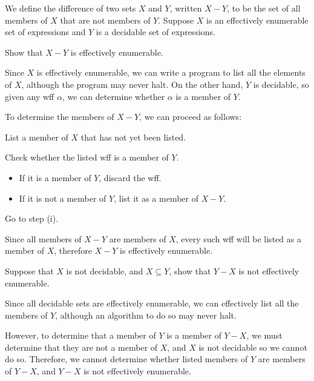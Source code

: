 \begin{problem}
  We define the difference of two sets $X$ and $Y$,
  written $X - Y$, to be the set of all members of $X$
  that are not members of $Y$.
  Suppose $X$ is an effectively enumerable set of expressions
  and $Y$ is a decidable set of expressions.
  \begin{enumalph}
    \item Show that $X - Y$ is effectively enumerable.
      \begin{Answer}
        Since $X$ is effectively enumerable, we can write a program to list
        all the elements of $X$, although the program may never halt.
        On the other hand, $Y$ is decidable, so given any wff $\alpha$,
        we can determine whether $\alpha$ is a member of $Y$.

        \step
        To determine the members of $X - Y$, we can proceed as follows:
        \begin{enumroman}
          \item List a member of $X$ that has not yet been listed.
          \item Check whether the listed wff is a member of $Y$.
            \begin{itemize}
              \item If it is a member of $Y$, discard the wff.
              \item If it is not a member of $Y$, list it as a member of $X - Y$.
            \end{itemize}
          \item Go to step (i).
        \end{enumroman}
        Since all members of $X - Y$ are members of $X$,
        every such wff will be listed as a member of $X$,
        therefore $X - Y$ is effectively enumerable.
      \end{Answer}
    \item Suppose that $X$ is not decidable, and $X \subseteq Y$,
      show that $Y - X$ is not effectively enumerable.
      \begin{Answer}
        Since all decidable sets are effectively enumerable,
        we can effectively list all the members of $Y$,
        although an algorithm to do so may never halt.

        \step
        However, to determine that a member of $Y$ is a member of $Y - X$,
        we must determine that they are not a member of $X$,
        and $X$ is not decidable so we cannot do so. 
        Therefore, we cannot determine whether listed members of $Y$ are members of $Y - X$,
        and $Y - X$ is not effectively enumerable.
      \end{Answer}
  \end{enumalph}
\end{problem}
